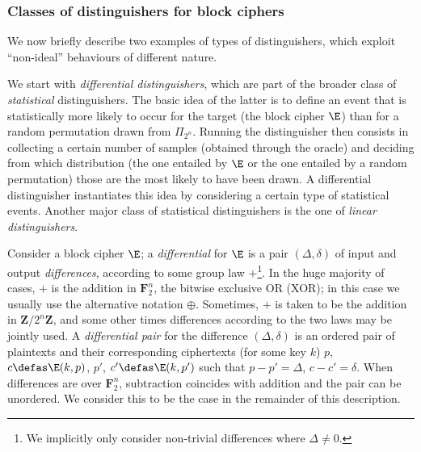 \subsubsection{Classes of distinguishers for block ciphers}
 
We now briefly describe two examples of types of distinguishers, which exploit ``non-ideal'' behaviours of different nature.

\bigskip

We start with \emph{differential distinguishers}, which are part of the broader class of \emph{statistical} distinguishers.
The basic idea of the latter is to define an event that is statistically more likely to occur for the target (the block cipher $\E$)
than for a random permutation drawn from $\Pi_{2^n}$. Running the distinguisher then consists in collecting a certain number of samples (obtained through
the oracle) and deciding from which distribution (the one entailed by $\E$ or the one entailed by a random permutation) those are the
most likely to have been drawn.
A differential distinguisher instantiates this idea by considering a certain type of statistical events. Another major class of
statistical distinguishers is the one of \emph{linear distinguishers}.

Consider a block cipher $\E$; a \emph{differential} for $\E$ is a pair $(\Delta,\delta)$ of input and output \emph{differences},
according to some group law $+$\footnote{We implicitly only consider non-trivial differences where $\Delta \neq 0$.}.
In the huge majority of cases, $+$ is the addition in $\mathbf{F}_2^n$,
\ie the bitwise exclusive OR (XOR); in this case we usually use the alternative notation $\oplus$. Sometimes, $+$
is taken to be the addition in $\mathbf{Z}/2^n\mathbf{Z}$, and some other times differences according to the two laws may be jointly used.
A \emph{differential pair} for the difference $(\Delta,\delta)$ is an ordered pair of plaintexts and their corresponding ciphertexts (for some
key $k$)
$p$, $c \defas \E(k,p)$, $p'$, $c' \defas \E(k,p')$ such that $p - p' = \Delta$, $c - c' = \delta$. When differences are over $\mathbf{F}_2^n$,
subtraction coincides with addition and the pair can be unordered. We consider this to be the case in the remainder of this description.

